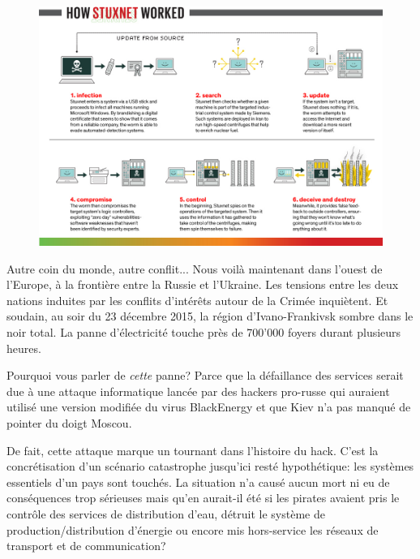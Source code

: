 \documentclass[article, french]{yReport}
\begin{document}
	\begin{figure}[ht!]
		\includegraphics[width=\textwidth]{images/stuxnet.jpg}
		\label{fig:stuxnet}
	\end{figure}
	
	Autre coin du monde, autre conflit... Nous voilà maintenant dans l'ouest de l'Europe, à la frontière entre la Russie et l'Ukraine. Les tensions entre les deux nations induites par les conflits d'intérêts autour de la Crimée inquiètent. Et soudain, au soir du 23 décembre 2015, la région d'Ivano-Frankivsk sombre dans le noir total. La panne d'électricité touche près de 700'000 foyers durant plusieurs heures.
	
	Pourquoi vous parler de \textit{cette} panne? Parce que la défaillance des services serait due à une attaque informatique lancée par des hackers pro-russe qui auraient utilisé une version modifiée du virus BlackEnergy et que Kiev n'a pas manqué de pointer du doigt Moscou.
	
	De fait, cette attaque marque un tournant dans l'histoire du hack. C'est la concrétisation d'un scénario catastrophe jusqu'ici resté hypothétique: les systèmes essentiels d'un pays sont touchés. La situation n'a causé aucun mort ni eu de conséquences trop sérieuses mais qu'en aurait-il été si les pirates avaient pris le contrôle des services de distribution d'eau, détruit le système de production/distribution d'énergie ou encore mis hors-service les réseaux de transport et de communication?
	
\end{document}
